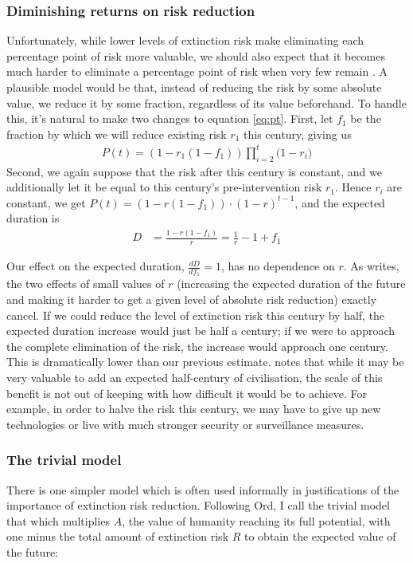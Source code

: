 \documentclass[british]{article}
\begin{document}
\subsubsection{Diminishing returns on risk reduction}\label{header-n123} Unfortunately, while lower levels of extinction risk make eliminating each percentage point of risk more valuable, we should also expect that it becomes much harder to eliminate a percentage point of risk when very few remain \citep{ord_modelling_????}.  A plausible model would be that, instead of reducing the risk by some absolute value, we reduce it by some fraction, regardless of its value beforehand. To handle this, it's natural to make two changes to equation \ref{eq:pt}. First, let $f_1$ be the fraction by which we will reduce existing risk $r_1$ this century, giving us
\begin{align}
P(t) =  (1-r_1(1-f_1)) \prod_{i=2}^t {(1-r_i})\label{eq:dr}
\end{align}
Second, we again suppose that the risk after this century is constant, and we additionally let it be equal to this century's pre-intervention risk $r_1$. Hence $r_i$ are constant, we get $P(t) = (1-r(1-f_1)) \cdot (1-r)^{t-1}$, and the expected duration is
\begin{align*}
D &= \frac{1 - r(1 - f_1)}{r} = \frac{1}{r} -1 +f_1
\end{align*}

Our effect on the expected duration, $\frac{dD}{df_1}=1$, has no dependence on \(r\). As \cite{ord_modelling_????} writes, the two effects of small values of \(r\) (increasing the expected duration of the future and making it harder to get a given level of absolute risk reduction) exactly cancel. If we could reduce the level of extinction risk this century by half, the expected duration increase would just be half a century; if we were to approach the complete elimination of the risk, the increase would approach one century. This is dramatically lower than our previous estimate. \cite{ord_modelling_????} notes that while it may be very valuable to add an expected half-century of civilisation, the scale of this benefit is not out of keeping with how difficult it would be to achieve. For example, in order to halve the risk this century, we may have to give up new technologies or live with much stronger security or surveillance measures.

\subsubsection{The trivial model}\label{header-n93}
There is one simpler model which is often used informally in justifications of the importance of extinction risk reduction. Following Ord, I call the trivial model that which multiplies \(A\), the value of humanity reaching its full potential, with one minus the total amount of extinction risk \(R\) to obtain the expected value of the future:
\end{document}
